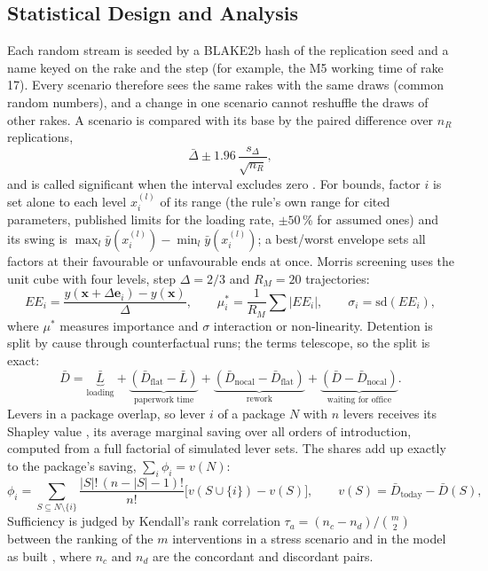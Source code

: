 \subsection{Statistical Design and Analysis}
Each random stream is seeded by a BLAKE2b hash of the replication seed and a name keyed on the rake and the step (for example, the M5 working time of rake 17). Every scenario therefore sees the same rakes with the same draws (common random numbers), and a change in one scenario cannot reshuffle the draws of other rakes. A scenario is compared with its base by the paired difference over $n_R$ replications,
\begin{equation}
\bar\Delta \pm 1.96\, \frac{s_\Delta}{\sqrt{n_R}},
\label{eq:ci}
\end{equation}
and is called significant when the interval excludes zero \cite{law}. For bounds, factor $i$ is set alone to each level $x_i^{(l)}$ of its range (the rule's own range for cited parameters, published limits for the loading rate, $\pm 50$\,\% for assumed ones) and its swing is $\max_l \bar y(x_i^{(l)}) - \min_l \bar y(x_i^{(l)})$; a best/worst envelope sets all factors at their favourable or unfavourable ends at once. Morris screening \cite{morris, campolongo} uses the unit cube with four levels, step $\Delta = 2/3$ and $R_M = 20$ trajectories:
\begin{equation}
EE_i = \frac{y(\mathbf{x} + \Delta \mathbf{e}_i) - y(\mathbf{x})}{\Delta}, \qquad \mu_i^{*} = \frac{1}{R_M}\sum |EE_i|, \qquad \sigma_i = \mathrm{sd}(EE_i),
\label{eq:morris}
\end{equation}
where $\mu^*$ measures importance and $\sigma$ interaction or non-linearity. Detention is split by cause through counterfactual runs; the terms telescope, so the split is exact:
\begin{equation}
\bar D = \underbrace{\bar L}_{\text{loading}} + \underbrace{(\bar D_{\text{flat}} - \bar L)}_{\text{paperwork time}} + \underbrace{(\bar D_{\text{nocal}} - \bar D_{\text{flat}})}_{\text{rework}} + \underbrace{(\bar D - \bar D_{\text{nocal}})}_{\text{waiting for office}} .
\label{eq:dsplit}
\end{equation}
Levers in a package overlap, so lever $i$ of a package $N$ with $n$ levers receives its Shapley value \cite{shapley}, its average marginal saving over all orders of introduction, computed from a full factorial of simulated lever sets. The shares add up exactly to the package's saving, $\sum_i \phi_i = v(N)$:
\begin{equation}
\phi_i = \sum_{S \subseteq N \setminus \{i\}} \frac{|S|!\,(n - |S| - 1)!}{n!} \big[v(S \cup \{i\}) - v(S)\big], \qquad v(S) = \bar D_{\text{today}} - \bar D(S),
\label{eq:shapley}
\end{equation}
Sufficiency is judged by Kendall's rank correlation $\tau_a = (n_c - n_d)/\binom{m}{2}$ between the ranking of the $m$ interventions in a stress scenario and in the model as built \cite{kendall}, where $n_c$ and $n_d$ are the concordant and discordant pairs.

